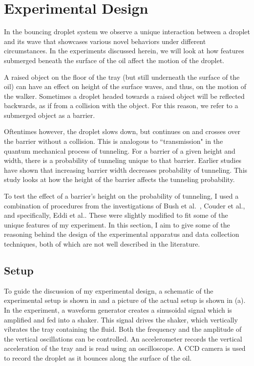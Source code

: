 \chapter{Experimental Design}
\label{Ch2}

In the bouncing droplet system we observe a unique interaction between a droplet and its wave that showcases various novel behaviors under different circumstances.  In the experiments discussed herein, we will look at how features submerged beneath the surface of the oil affect the motion of the droplet. 

A raised object on the floor of the tray (but still underneath the surface of the oil) can have an effect on height of the surface waves, and thus, on the motion of the walker. Sometimes a droplet headed towards a raised object will be reflected backwards, as if from a collision with the object. For this reason, we refer to a submerged object as a barrier. 

Oftentimes however, the droplet slows down, but continues on and crosses over the barrier without a collision. This is analogous to ``transmission" in the quantum mechanical process of tunneling. For a barrier of a given height and width, there is a probability of tunneling unique to that barrier. Earlier studies have shown that increasing barrier width decreases probability of tunneling. This study looks at how the height of the barrier affects the tunneling probability. 

To test the effect of a barrier's height on the probability of tunneling, I used a combination of procedures from the investigations of Bush et al.~, Couder et al., and specifically, Eddi et al.. These were slightly modified to fit some of the unique features of my experiment. In this section, I aim to give some of the reasoning behind the  design of the experimental apparatus and data collection techniques, both of which are not well described in the literature.

\section{Setup}
   To guide the discussion of my experimental design, a schematic of the experimental setup is shown in  and a picture of the actual setup is shown in (a). In the experiment, a waveform generator creates a sinusoidal signal which is amplified and fed into a shaker. This signal drives the shaker, which vertically vibrates the tray containing the fluid. Both the frequency and the amplitude of the vertical oscillations can be controlled. An accelerometer records the vertical acceleration of the tray and is read using an oscilloscope. A CCD camera is used to record the droplet as it bounces along the surface of the oil.
    
